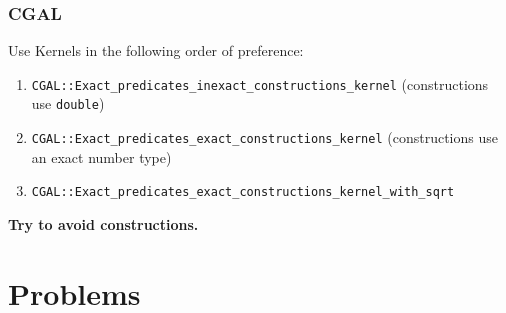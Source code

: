 \documentclass[10pt,a4paper,landscape,twocolumn,twoside]{article}
\begin{document}
	\subsubsection{CGAL}
	\label{subs:CGAL}
		Use Kernels in the following order of preference:
		\begin{enumerate}
			\item \texttt{CGAL::Exact\_predicates\_inexact\_constructions\_kernel} (constructions use \texttt{double})
			\item \texttt{CGAL::Exact\_predicates\_exact\_constructions\_kernel} (constructions use an exact number type)
			\item \texttt{CGAL::Exact\_predicates\_exact\_constructions\_kernel\_with\_sqrt}
		\end{enumerate}

		\textbf{Try to avoid constructions.}

\newpage
\section{Problems}
%




\end{document}
